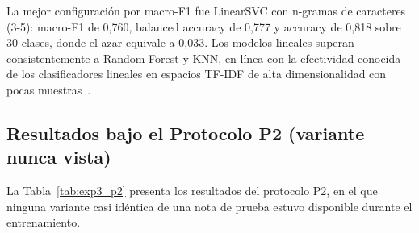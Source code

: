 La mejor configuración por macro-F1 fue LinearSVC con n-gramas de caracteres (3-5): macro-F1 de 0,760, balanced accuracy de 0,777 y accuracy de 0,818 sobre 30 clases, donde el azar equivale a 0,033. Los modelos lineales superan consistentemente a Random Forest y KNN, en línea con la efectividad conocida de los clasificadores lineales en espacios TF-IDF de alta dimensionalidad con pocas muestras~\cite{joachims1998}.

\subsection{Resultados bajo el Protocolo P2 (variante nunca vista)}

La Tabla~\ref{tab:exp3_p2} presenta los resultados del protocolo P2, en el que ninguna variante casi idéntica de una nota de prueba estuvo disponible durante el entrenamiento.

\begin{table}[ht]
\centering
\caption{Clasificación NLP bajo el protocolo P2 (grupos de casi-duplicados no repartidos, 2-fold CV $\times$ 10 semillas)}
\label{tab:exp3_p2}
\end{table}

